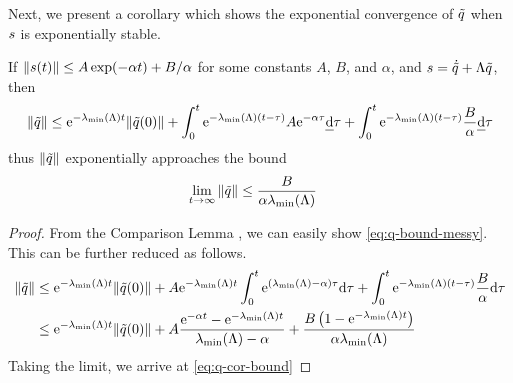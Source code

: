 Next, we present a corollary which shows the exponential convergence of $\tilde{ q}$ when $ s$ is exponentially stable.
\begin{corollary}
\label{cor:q-bound}

If $\| s(t)\|\leq A \exp(-\alpha t) + B / \alpha$ for some constants $A$, $B$, and $\alpha$, and $  s = \dot{\tilde{ q}} + \Lambda \tilde{ q}$, then 
\begin{align}
\label{eq:q-bound-messy}
\|\tilde{ q}\| \leq \mathrm{e}^{-\lambda_\text{\normalfont{min}}(\Lambda)t}\|\tilde{ q}(0)\| + \int_0^t \mathrm{e}^{-\lambda_\text{\normalfont{min}}(\Lambda)(t-\tau)} A \mathrm{e}^{- \alpha \tau}\text{\emph{d}}\tau +
\int_0^t\mathrm{e}^{-\lambda_\text{\normalfont{min}}(\Lambda)(t-\tau)}\frac{B}{\alpha} \text{\emph{d}}\tau
\end{align}
thus $\|\tilde{ q}\|$ exponentially approaches the bound
\begin{align}
    \label{eq:q-cor-bound}
    \lim_{t\rightarrow\infty}\|\tilde{ q}\| &\leq \frac{B}{\alpha \lambda_\text{\normalfont{min}}(\Lambda)}
\end{align}
\end{corollary}

\begin{proof}
From the Comparison Lemma \cite{khalil_nonlinear_2002}, we can easily show \cref{eq:q-bound-messy}. This can be further reduced as follows.
\begin{align}
    \|\tilde{ q}\| 
    &\leq \mathrm{e}^{-\lambda_\text{\normalfont{min}}(\Lambda)t}\|\tilde{ q}(0)\| + A\mathrm{e}^{-\lambda_\text{\normalfont{min}}(\Lambda)t}\int_0^t \mathrm{e}^{(\lambda_\text{\normalfont{min}}(\Lambda)- \alpha) \tau}\text{d}\tau +
    \int_0^t\mathrm{e}^{-\lambda_\text{\normalfont{min}}(\Lambda)(t-\tau)}\frac{B}{\alpha} \text{d}\tau\\
    &
    \leq \mathrm{e}^{-\lambda_\text{\normalfont{min}}(\Lambda)t}\|\tilde{ q}(0)\| + A\frac{\mathrm{e}^{-\alpha t}-\mathrm{e}^{-\lambda_\text{\normalfont{min}}(\Lambda)t}}{\lambda_\text{\normalfont{min}}(\Lambda)-\alpha}+ \frac{B \left(1-\mathrm{e}^{-\lambda_\text{\normalfont{min}}(\Lambda)t}\right)}{\alpha \lambda_\text{\normalfont{min}}(\Lambda)}
\end{align}
Taking the limit, we arrive at \cref{eq:q-cor-bound}

\end{proof}


